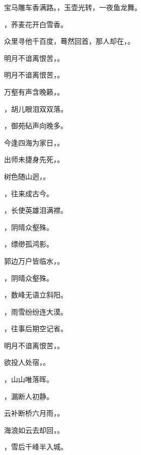 \documentclass[12pt, a4paper, addpoints]{exam}
\begin{document}
\begin{questions}
\question[1] 宝马雕车香满路。\uline{\qquad\qquad\qquad}，玉壶光转，一夜鱼龙舞。

\question[1] \uline{\qquad\qquad\qquad}，荞麦花开白雪香。

\question[1] 众里寻他千百度，蓦然回首，那人却在，\uline{\qquad\qquad\qquad}。

\question[1] 明月不谙离恨苦，\uline{\qquad\qquad\qquad}。

\question[1] 明月不谙离恨苦，\uline{\qquad\qquad\qquad}。

\question[1] 万壑有声含晚籁，\uline{\qquad\qquad\qquad}。

\question[1] \uline{\qquad\qquad\qquad}，胡儿眼泪双双落。

\question[1] \uline{\qquad\qquad\qquad}，御苑砧声向晚多。

\question[1] 今逢四海为家日，\uline{\qquad\qquad\qquad}。

\question[1] 出师未捷身先死，\uline{\qquad\qquad\qquad}。

\question[1] 树色随山迥，\uline{\qquad\qquad\qquad}。

\question[1] \uline{\qquad\qquad\qquad}，往来成古今。

\question[1] \uline{\qquad\qquad\qquad}，长使英雄泪满襟。

\question[1] \uline{\qquad\qquad\qquad}，阴晴众壑殊。

\question[1] \uline{\qquad\qquad\qquad}，缥缈孤鸿影。

\question[1] 郭边万户皆临水，\uline{\qquad\qquad\qquad}。

\question[1] \uline{\qquad\qquad\qquad}，阴晴众壑殊。

\question[1] \uline{\qquad\qquad\qquad}，数峰无语立斜阳。

\question[1] \uline{\qquad\qquad\qquad}，雨雪纷纷连大漠。

\question[1] \uline{\qquad\qquad\qquad}，往事后期空记省。

\question[1] 明月不谙离恨苦，\uline{\qquad\qquad\qquad}。

\question[1] 欲投人处宿，\uline{\qquad\qquad\qquad}。

\question[1] \uline{\qquad\qquad\qquad}，山山唯落晖。

\question[1] \uline{\qquad\qquad\qquad}，漏断人初静。

\question[1] 云补断桥六月雨，\uline{\qquad\qquad\qquad}。

\question[1] 海浪如云去却回，\uline{\qquad\qquad\qquad}。

\question[1] \uline{\qquad\qquad\qquad}，雪后千峰半入城。


\end{questions}
\end{document}
